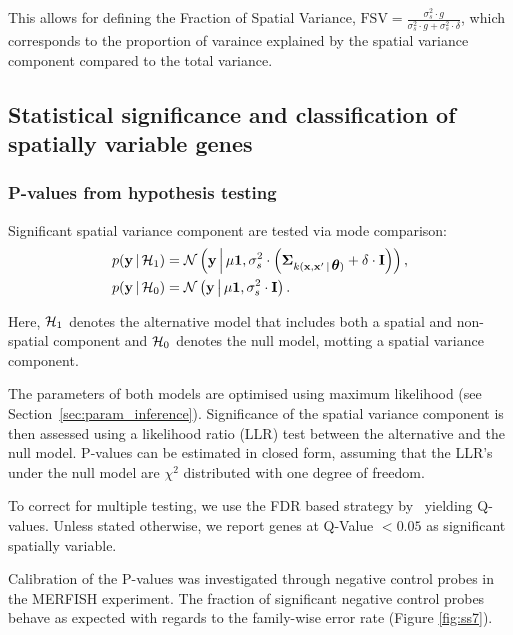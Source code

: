 This allows for defining the Fraction of Spatial Variance, $ \text{FSV} = \frac{\sigma^2_s \cdot g}{\sigma^2_s \cdot g + \sigma^2_s \cdot \delta} $, which corresponds to the proportion of varaince explained by the spatial variance component compared to the total variance.

\subsection{Statistical significance and classification of spatially variable genes}

\subsubsection*{P-values from hypothesis testing}

Significant spatial variance component are tested via mode comparison: 
\begin{align*}
    p({\bf y} \,|\, \mathcal{H}_1) &=  \mathcal{N}\left({\bf y} \,\middle | \, \mu {\bf 1}, \sigma_s^2 \cdot \left ( \mbox{\boldmath $\Sigma$}_{k({\bf x},{\bf x}'\,|\, \mbox{\boldmath $\theta$})} + \delta \cdot {\bf I} \right )\right), \\
    p({\bf y} \,|\, \mathcal{H}_0) &=  \mathcal{N}\left({\bf y} \,\middle | \, \mu {\bf 1},  \sigma_s^2 \cdot {\bf I}\right).
\end{align*}

Here, $\mathcal{H}_1$ denotes the alternative model that includes both a spatial and non-spatial component and $\mathcal{H}_0$ denotes the null model, motting a spatial variance component.

The parameters of both models are optimised using maximum likelihood (see Section~\ref{sec:param_inference}).
Significance of the spatial variance component is then assessed using a likelihood ratio (LLR) test between the alternative and the null model. 
P-values can be estimated in closed form, assuming that the LLR's under the null model are \( \chi^2 \) distributed with one degree of freedom.

\begin{sloppypar}
To correct for multiple testing, we use the FDR based strategy by~\cite{Storey2003-ap} yielding Q-values.  Unless stated otherwise, we report genes at Q-Value \( < 0.05 \) as significant spatially variable.
\end{sloppypar}

Calibration of the P-values was investigated through negative control probes in the MERFISH experiment. The fraction of significant negative control probes behave as expected with regards to the family-wise error rate (Figure \ref{fig:ss7}).


